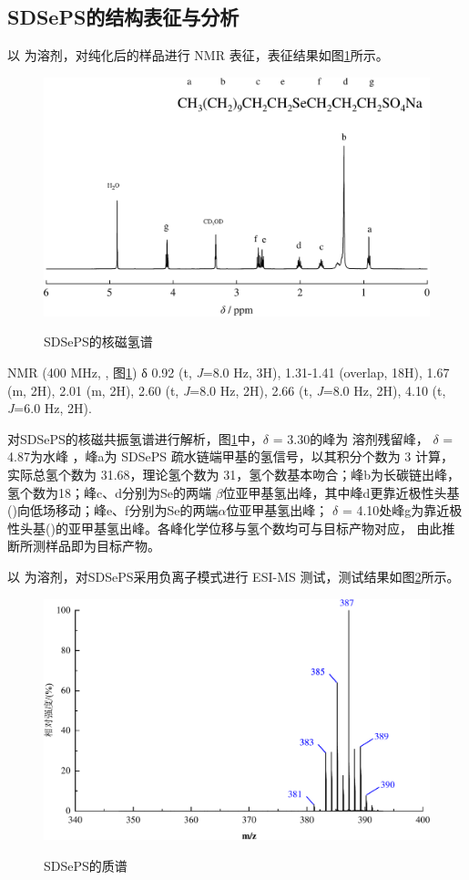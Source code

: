 \documentclass[bachelor,winfonts,replaceperiod]{jnuthesis}
\begin{document}
    \subsection{SDSePS的结构表征与分析}
    以 为溶剂，对纯化后的样品进行  NMR 表征，表征结果如图\ref{fig:SDSePS-nmr}所示。
    \begin{figure}[htbp]
        \centering
        \includegraphics[width=.7\textwidth]{figure/SDSePS-nmr.pdf}\\
        \caption{SDSePS的核磁氢谱}\label{fig:SDSePS-nmr}
    \end{figure}
     
     NMR (400 MHz, , 图\ref{fig:SDSePS-nmr}) δ 0.92 (t, \textit{J}=8.0 Hz, 3H), 1.31-1.41 (overlap, 18H), 
    1.67 (m, 2H), 2.01 (m, 2H), 2.60 (t, \textit{J}=8.0 Hz, 2H), 2.66 (t, \textit{J}=8.0 Hz, 2H),  4.10 (t, \textit{J}=6.0 Hz, 2H).
    
    对SDSePS的核磁共振氢谱进行解析，图\ref{fig:SDSePS-nmr}中，$\delta$ = 3.30的峰为 溶剂残留峰，
    $\delta$ = 4.87为水峰\cite{波谱解析} ，峰a为 SDSePS 疏水链端甲基的氢信号，以其积分个数为 3 计算，
    实际总氢个数为 31.68，理论氢个数为 31，氢个数基本吻合；峰b为长碳链出峰，氢个数为18；峰c、d分别为Se的两端
    $\beta$位亚甲基氢出峰\cite{徐辉碧1994,reich1978}，其中峰d更靠近极性头基()向低场移动；峰e、f分别为Se的两端$\alpha$位亚甲基氢出峰；
    $\delta$ = 4.10处峰g为靠近极性头基()的亚甲基氢出峰。各峰化学位移与氢个数均可与目标产物对应，
    由此推断所测样品即为目标产物。
    
    以 为溶剂，对SDSePS采用负离子模式进行 ESI-MS 测试，测试结果如图\ref{fig:SDSePS-mass}所示。
     \begin{figure}[htbp]
        \centering
        \includegraphics[width=.7\textwidth]{figure/SDSePS-mass.pdf}\\
        \caption{SDSePS的质谱}\label{fig:SDSePS-mass}
    \end{figure}
    
\end{document}
